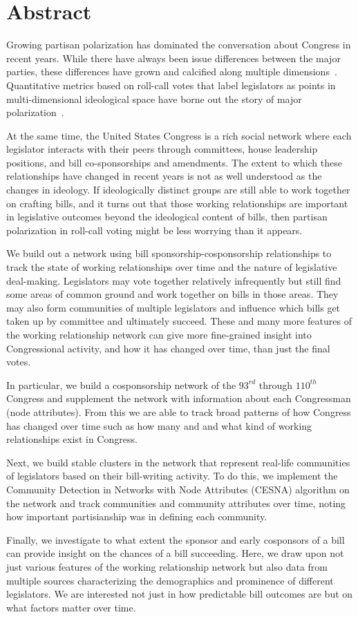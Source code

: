 \section{Abstract}

Growing partisan polarization has dominated the conversation about Congress in
recent years. While there have always been issue differences between the major
parties, these differences have grown and calcified along multiple
dimensions~\cite{Layman}. Quantitative metrics based on roll-call votes that
label legislators as points in multi-dimensional ideological space have borne
out the story of major polarization~\cite{Poole}.

At the same time, the United States Congress is a rich social network where each
legislator interacts with their peers through committees, house leadership
positions, and bill co-sponsorships and amendments. The extent to which these
relationships have changed in recent years is not as well understood as the
changes in ideology. If ideologically distinct groups are still able to work
together on crafting bills, and it turns out that those working relationships
are important in legislative outcomes beyond the ideological content of bills,
then partisan polarization in roll-call voting might be less worrying than it
appears.

We build out a network using bill sponsorship-cosponsorship relationships to
track the state of working relationships over time and the nature of legislative
deal-making. Legislators may vote together relatively infrequently but still
find some areas of common ground and work together on bills in those areas. They
may also form communities of multiple legislators and influence which bills get
taken up by committee and ultimately succeed. These and many more features of
the working relationship network can give more fine-grained insight into
Congressional activity, and how it has changed over time, than just the final
votes.

In particular, we build a cosponsorship network of the $93^{rd}$ through
$110^{th}$ Congress and supplement the network with information about each
Congressman (node attributes). From this we are able to track broad patterns of
how Congress has changed over time such as how many and and what kind of working
relationships exist in Congress.

Next, we build stable clusters in the network that represent real-life
communities of legislators based on their bill-writing activity. To do this, we
implement the Community Detection in Networks with Node Attributes (CESNA)
algorithm on the network and track communities and community attributes over
time, noting how important partisianship was in defining each community.

Finally, we investigate to what extent the sponsor and early cosponsors of a
bill can provide insight on the chances of a bill succeeding. Here, we draw upon
not just various features of the working relationship network but also data from
multiple sources characterizing the demographics and prominence of different
legislators. We are interested not just in how predictable bill outcomes are but
on what factors matter over time.
